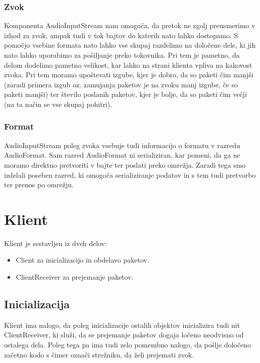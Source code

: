 \documentclass[journal]{IEEEtran}
\begin{document}

\subsubsection{Zvok}
Komponenta AudioInputStream nam omogoča, da pretok ne zgolj preusmerimo v izhod za zvok, ampak tudi v tok bajtov do katerih nato lahko dostopamo. S pomočjo vsebine formata nato lahko vse skupaj razdelimo na določene dele, ki jih nato lahko uporabimo za pošiljanje preko tokovnika. Pri tem je pametno, da delom dodelimo pametno velikost, kar lahko na strani klienta vpliva na kakovost zvoka. Pri tem moramo upoštevati izgube, kjer je dobro, da so paketi čim manjši (zaradi primera izgub oz. zamujanja paketov je na zvoku manj izgube, če so paketi manjši) ter število poslanih paketov, kjer je bolje, da so paketi čim večji (na ta način se vse skupaj pohitri).

\subsubsection{Format}
AudioInputStream poleg zvoka vsebuje tudi informacijo o formatu v razredu AudioFormat. Sam razred AudioFormat ni serializiran, kar pomeni, da ga ne moramo direktno pretvoriti v bajte ter poslati preko omrežja. Zaradi tega smo izdelali poseben razred, ki omogoča serializiranje podatov in s tem tudi pretvorbo ter prenos po omrežju.


\section{Klient}

Klient je sestavljen iz dveh delov:
\begin{itemize}
	\item Client za inicializacijo in obdelavo paketov.
	\item  ClientReceiver za prejemanje paketov.
\end{itemize}

\subsection{Inicializacija}
Klient ima nalogo, da poleg inicializacije ostalih objektov inicializira tudi nit ClientReceiver, ki služi, da se prejemanje paketov dogaja ločeno neodvisno od ostalega dela. Poleg tega pa ima tudi zelo pomembno nalogo, da pošlje določeno začetno kodo s čimer označi strežniku, da želi prejemati zvok.
\end{document}
